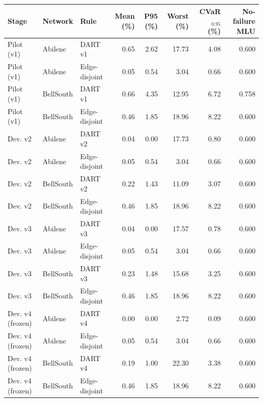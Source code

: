 \begin{tabular}{lllrrrrr}
\toprule
Stage & Network & Rule & Mean (\%) & P95 (\%) & Worst (\%) & CVaR$_{0.95}$ (\%) & No-failure MLU \\
\midrule
Pilot (v1) & Abilene & DART v1 & 0.65 & 2.62 & 17.73 & 4.08 & 0.600 \\
Pilot (v1) & Abilene & Edge-disjoint & 0.05 & 0.54 & 3.04 & 0.66 & 0.600 \\
\addlinespace
Pilot (v1) & BellSouth & DART v1 & 0.66 & 4.35 & 12.95 & 6.72 & 0.758 \\
Pilot (v1) & BellSouth & Edge-disjoint & 0.46 & 1.85 & 18.96 & 8.22 & 0.600 \\
\addlinespace
Dev. v2 & Abilene & DART v2 & 0.04 & 0.00 & 17.73 & 0.80 & 0.600 \\
Dev. v2 & Abilene & Edge-disjoint & 0.05 & 0.54 & 3.04 & 0.66 & 0.600 \\
\addlinespace
Dev. v2 & BellSouth & DART v2 & 0.22 & 1.43 & 11.09 & 3.07 & 0.600 \\
Dev. v2 & BellSouth & Edge-disjoint & 0.46 & 1.85 & 18.96 & 8.22 & 0.600 \\
\addlinespace
Dev. v3 & Abilene & DART v3 & 0.04 & 0.00 & 17.57 & 0.78 & 0.600 \\
Dev. v3 & Abilene & Edge-disjoint & 0.05 & 0.54 & 3.04 & 0.66 & 0.600 \\
\addlinespace
Dev. v3 & BellSouth & DART v3 & 0.23 & 1.48 & 15.68 & 3.25 & 0.600 \\
Dev. v3 & BellSouth & Edge-disjoint & 0.46 & 1.85 & 18.96 & 8.22 & 0.600 \\
\addlinespace
Dev. v4 (frozen) & Abilene & DART v4 & 0.00 & 0.00 & 2.72 & 0.09 & 0.600 \\
Dev. v4 (frozen) & Abilene & Edge-disjoint & 0.05 & 0.54 & 3.04 & 0.66 & 0.600 \\
\addlinespace
Dev. v4 (frozen) & BellSouth & DART v4 & 0.19 & 1.00 & 22.30 & 3.38 & 0.600 \\
Dev. v4 (frozen) & BellSouth & Edge-disjoint & 0.46 & 1.85 & 18.96 & 8.22 & 0.600 \\
\bottomrule
\end{tabular}
